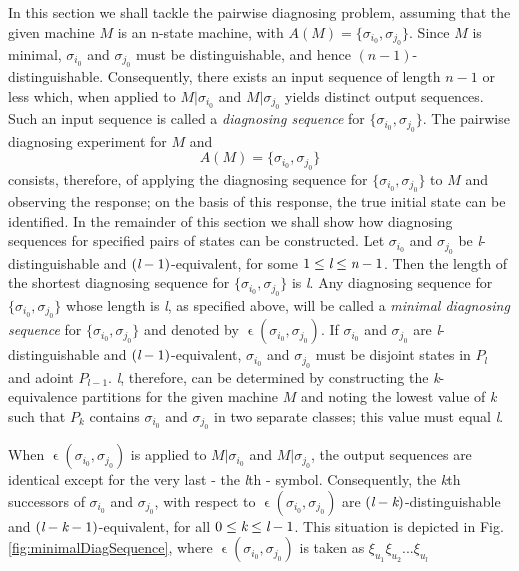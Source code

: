     In this section we shall tackle the pairwise diagnosing problem, assuming that the given machine $M$ is an n-state machine, with $A(M) = \{ \sigma_{i_{0}}, \sigma_{j_{0}} \}$. Since $M$ is minimal, $\sigma_{i_{0}}$ and $\sigma_{j_{0}}$ must be distinguishable, and hence $(n-1)$-distinguishable. Consequently, there exists an input sequence of length $n-1$ or less which, when applied to $ M|\sigma_{i_{0}}$ and $ M|\sigma_{j_{0}}$ yields distinct output sequences. Such an input sequence is called a \emph{diagnosing sequence} for $ \{  \sigma_{i_{0}}, \sigma_{j_{0}} \} $. The pairwise diagnosing experiment for $M$ and 
\begin{equation*}
    A(M) = \{ \sigma_{i_{0}}, \sigma_{j_{0}} \} 
\end{equation*}
consists, therefore, of applying the diagnosing sequence for $ \{  \sigma_{i_{0}}, \sigma_{j_{0}} \} $ to $M$ and observing the response; on the basis of this response, the true initial state can be identified. In the remainder of this section we shall show how diagnosing sequences for specified pairs of states can be constructed. Let $\sigma_{i_{0}}$ and $\sigma_{j_{0}}$ be \emph{l}-distinguishable and $(\emph{l}-1)$-equivalent, for some $1 \leq \emph{l} \leq \emph{n}-1 $. Then the length of the shortest diagnosing sequence for $ \{  \sigma_{i_{0}}, \sigma_{j_{0}} \} $ is \emph{l}. Any diagnosing sequence for $ \{  \sigma_{i_{0}}, \sigma_{j_{0}} \} $ whose length is \emph{l}, as specified above, will be called a \emph{minimal diagnosing sequence} for $ \{  \sigma_{i_{0}}, \sigma_{j_{0}} \} $ and denoted by $ \upvarepsilon(\sigma_{i_{0}}, \sigma_{j_{0}} )  $. If $\sigma_{i_{0}}$ and $\sigma_{j_{0}}$ are \emph{l}-distinguishable and $(\emph{l}-1)$-equivalent, $\sigma_{i_{0}}$ and $\sigma_{j_{0}}$ must be disjoint states in $P_l$ and adoint $P_{l-1}$. \emph{l}, therefore, can be determined by constructing the \emph{k}-equivalence partitions for the given machine $M$ and noting the lowest value of \emph{k} such that $P_k$ contains $\sigma_{i_{0}}$ and $\sigma_{j_{0}}$  in two separate classes; this value must equal \emph{l}.

When $ \upvarepsilon(\sigma_{i_{0}}, \sigma_{j_{0}} ) $ is applied to $ M|\sigma_{i_{0}}$ and $ M|\sigma_{j_{0}}$, the output sequences are identical except for the very last - the \emph{l}th - symbol. Consequently, the \emph{k}th successors of $\sigma_{i_{0}}$ and $\sigma_{j_{0}}$, with respect to $ \upvarepsilon(\sigma_{i_{0}}, \sigma_{j_{0}} ) $ are $ (\emph{l} - \emph{k})$-distinguishable and $(\emph{l} - \emph{k} - 1)$-equivalent, for all $0 \leq \emph{k} \leq \emph{l}-1 $. This situation is depicted in Fig. \ref{fig:minimalDiagSequence}, where $ \upvarepsilon(\sigma_{i_{0}}, \sigma_{j_{0}} ) $  is taken as $\xi_{u_{1}}\xi_{u_{2}}...\xi_{u_{l}}$

